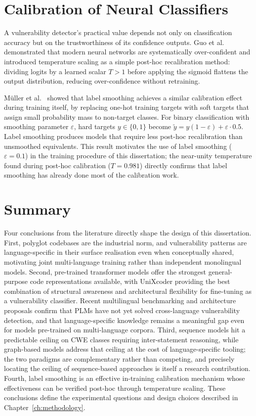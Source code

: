 \section{Calibration of Neural Classifiers}

A vulnerability detector's practical value depends not only on classification accuracy
but on the trustworthiness of its confidence outputs.
Guo et al.~\cite{guo2017calibration} demonstrated that modern neural networks are systematically
over-confident and introduced temperature scaling as a simple post-hoc recalibration
method: dividing logits by a learned scalar $T > 1$ before applying the sigmoid flattens
the output distribution, reducing over-confidence without retraining.

M\"{u}ller et al.~\cite{muller2019label} showed that label smoothing achieves a similar calibration effect
during training itself, by replacing one-hot training targets with soft targets that assign
small probability mass to non-target classes.
For binary classification with smoothing parameter $\varepsilon$, hard targets
$y \in \{0,1\}$ become $\tilde{y} = y(1-\varepsilon) + \varepsilon \cdot 0.5$.
Label smoothing produces models that require less post-hoc recalibration than
unsmoothed equivalents.
This result motivates the use of label smoothing ($\varepsilon = 0.1$) in the training
procedure of this dissertation; the near-unity temperature found during post-hoc
calibration ($T = 0.981$) directly confirms that label smoothing has already done most
of the calibration work.

\section{Summary}

Four conclusions from the literature directly shape the design of this dissertation.
First, polyglot codebases are the industrial norm, and vulnerability patterns are
language-specific in their surface realisation even when conceptually shared, motivating
joint multi-language training rather than independent monolingual models.
Second, pre-trained transformer models offer the strongest general-purpose code
representations available, with UniXcoder providing the best combination of structural
awareness and architectural flexibility for fine-tuning as a vulnerability classifier.
Recent multilingual benchmarking \cite{shu2026multilingual} and architecture proposals
\cite{nguyen2025mulvuln} confirm that PLMs have not yet solved cross-language
vulnerability detection, and that language-specific knowledge remains a meaningful gap
even for models pre-trained on multi-language corpora.
Third, sequence models hit a predictable ceiling on CWE classes requiring inter-statement
reasoning, while graph-based models address that ceiling at the cost of language-specific
tooling; the two paradigms are complementary rather than competing, and precisely locating
the ceiling of sequence-based approaches is itself a research contribution.
Fourth, label smoothing is an effective in-training calibration mechanism whose
effectiveness can be verified post-hoc through temperature scaling.
These conclusions define the experimental questions and design choices described in
Chapter~\ref{ch:methodology}.
